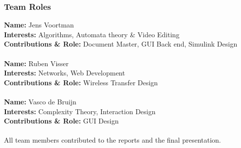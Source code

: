 \begin{small}
\subsubsection{Team Roles}
{\bfseries Name:} Jens Voortman\\
{\bfseries Interests:} Algorithms, Automata theory \& Video Editing\\
{\bfseries Contributions \& Role:} Document Master, GUI Back end, Simulink Design\\\\
{\bfseries Name:} Ruben Visser\\
{\bfseries Interests:} Networks, Web Development\\
{\bfseries Contributions \& Role:} Wireless Transfer Design\\\\
{\bfseries Name:} Vasco de Bruijn\\
{\bfseries Interests:} Complexity Theory, Interaction Design\\
{\bfseries Contributions \& Role:} GUI Design\\\\
All team members contributed to the reports and the final presentation.


\end{small}
